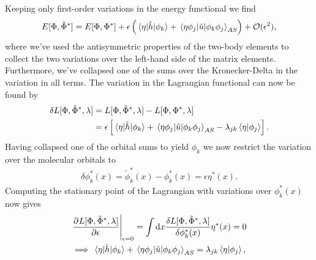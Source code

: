             Keeping only first-order variations in the energy functional we find
            \begin{align}
                E[\Phi, \tilde{\Phi}^{*}]
                = E[\Phi, \Phi^{*}]
                + \epsilon\left( 
                    \mel*{\eta}{\hat{h}}{\phi_k}
                    + \mel*{\eta\phi_j}{\hat{u}}{\phi_k\phi_j}_{AS}
                 \right)
                + \mathcal{O}(\epsilon^2),
            \end{align}
            where we've used the antisymmetric properties of the two-body
            elements to collect the two variations over the left-hand side of
            the matrix elements.
            Furthermore, we've collapsed one of the sums over the
            Kronecker-Delta in the variation in all terms.
            The variation in the Lagrangian functional can now be found by
            \begin{align}
                \delta L[\Phi, \tilde{\Phi}^{*}, \lambda]
                &=
                L[\Phi, \tilde{\Phi}^{*}, \lambda]
                -
                L[\Phi, \Phi^{*}, \lambda]
                \\
                &=
                \epsilon\left[ 
                    \mel*{\eta}{\hat{h}}{\phi_k}
                    +
                    \mel*{\eta\phi_j}{\hat{u}}{\phi_k\phi_j}_{AS}
                    - \lambda_{jk}
                    \braket*{\eta}{\phi_j}
                 \right].
            \end{align}
            Having collapsed one of the orbital sums to yield $\phi_k$ we now
            restrict the variation over the molecular orbitals to
            \begin{align}
                \delta\phi^{*}_k(x)
                = \tilde{\phi}^{*}_k(x)
                - \phi^{*}_k(x)
                = \epsilon\eta^{*}(x).
            \end{align}
            Computing the stationary point of the Lagrangian with variations
            over $\phi^{*}_k(x)$ now gives
            \begin{gather}
                \left.
                \dpd{
                    \lagrangianfunc{\slat, \tilde{\slat}^{*}, \lambda}
                }{\epsilon}
                \right\lvert_{\epsilon = 0}
                =
                \int\dd x\frac{
                    \delta\lagrangianfunc{\slat, \tilde{\slat}^{*}, \lambda}
                }{\delta \phi^{*}_k(x)}
                \eta^{*}(x)
                = 0
                \\
                \implies
                \mel*{\eta}{\onehamil}{\phi_k}
                + \mel*{\eta\phi_j}{\twohamil}{\phi_k\phi_j}_{AS}
                = \lambda_{jk}\braket*{\eta}{\phi_j},
                \label{eq:stationary-lagrangian}
            \end{gather}
